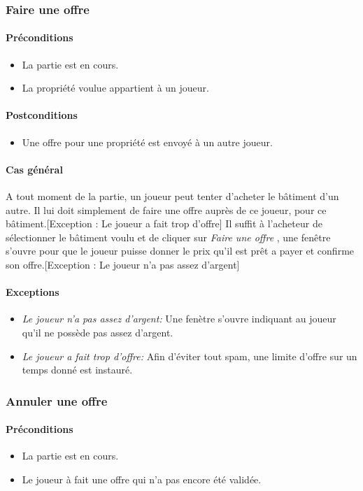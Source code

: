 \documentclass[a4paper,11pt]{report}
\begin{document}
\subsubsection{Faire une offre}
\paragraph{Préconditions}
\begin{itemize}
 \item La partie est en cours.
 \item La propriété voulue appartient à un joueur.
\end{itemize}
\paragraph{Postconditions}
\begin{itemize}
 \item Une offre pour une propriété est envoyé à un autre joueur.
\end{itemize}
\paragraph{Cas général}
A tout moment de la partie, un joueur peut tenter d'acheter le bâtiment d'un autre. Il lui doit simplement de faire une offre auprès de ce joueur, pour ce bâtiment.[Exception : Le joueur a fait trop d'offre] Il suffit à l'acheteur de sélectionner le bâtiment voulu et de cliquer sur \og \textit{Faire une offre} \fg, une fenêtre s'ouvre pour que le joueur puisse donner le prix qu'il est prêt a payer et confirme son offre.[Exception : Le joueur n'a pas assez d'argent] 
\paragraph{Exceptions}
\begin{itemize}
 \item \textit{Le joueur n'a pas assez d'argent:} Une fenètre s'ouvre indiquant au joueur qu'il ne possède pas assez d'argent.
 \item \textit{Le joueur a fait trop d'offre:} Afin d'éviter tout spam, une limite d'offre sur un temps donné est instauré.
\end{itemize}
\subsubsection{Annuler une offre}
\paragraph{Préconditions}
\begin{itemize}
 \item La partie est en cours.
 \item Le joueur à fait une offre qui n'a pas encore été validée.
\end{itemize}
\end{document}
